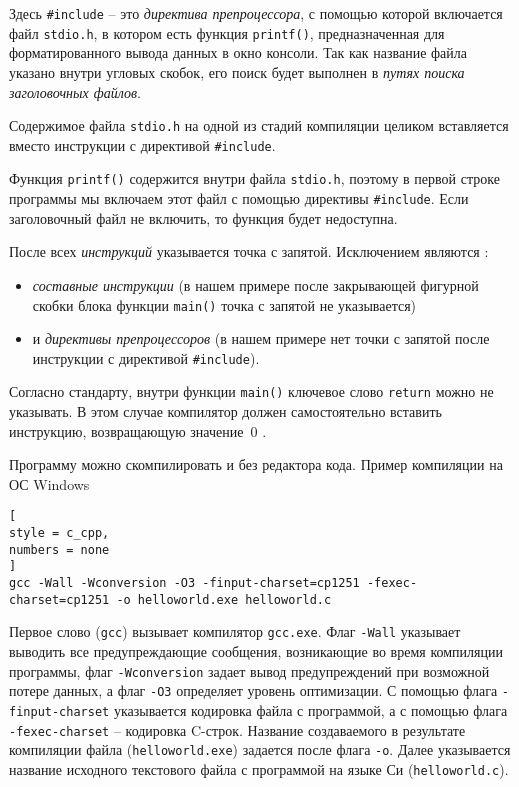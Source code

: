 \documentclass[%
	11pt,
	a4paper,
	utf8,
		]{article}
\begin{document}
Здесь \verb|#include| -- это \emph{директива препроцессора}, с помощью которой включается файл \verb|stdio.h|, в котором есть функция \verb|printf()|, предназначенная для форматированного вывода данных в окно консоли. Так как название файла указано внутри угловых скобок, его поиск будет выполнен в \emph{путях поиска заголовочных файлов}.

Содержимое файла \verb|stdio.h| на одной из стадий компиляции целиком вставляется вместо инструкции с директивой \verb|#include|.

Функция \verb|printf()| содержится внутри файла \verb|stdio.h|, поэтому в первой строке программы мы включаем этот файл с помощью директивы \verb|#include|. Если заголовочный файл не включить, то функция будет недоступна.

После всех \emph{инструкций} указывается точка с запятой. Исключением являются \cite[]{prokhorenok-prog-c:2020}:
\begin{itemize}
	\item \emph{составные инструкции} (в нашем примере после закрывающей фигурной скобки блока функции \verb|main()| точка с запятой не указывается)
	
	\item и \emph{директивы препроцессоров} (в нашем примере нет точки с запятой после инструкции с директивой \verb|#include|).
\end{itemize}

Согласно стандарту, внутри функции \verb|main()| ключевое слово \verb|return| можно не указывать. В этом случае компилятор должен самостоятельно вставить инструкцию, возвращающую значение~0 \cite[]{prokhorenok-prog-c:2020}.

Программу можно скомпилировать и без редактора кода. Пример компиляции на ОС Windows
\begin{lstlisting}[
style = c_cpp,
numbers = none
]
gcc -Wall -Wconversion -O3 -finput-charset=cp1251 -fexec-charset=cp1251 -o helloworld.exe helloworld.c
\end{lstlisting}

Первое слово (\verb|gcc|) вызывает компилятор \verb|gcc.exe|. Флаг \verb|-Wall| указывает выводить все предупреждающие сообщения, возникающие во время компиляции программы, флаг \verb|-Wconversion| задает вывод предупреждений при возможной потере данных, а флаг \verb|-O3| определяет уровень оптимизации. С помощью флага \verb|-finput-charset| указывается кодировка файла с программой, а с помощью флага \verb|-fexec-charset| -- кодировка C-строк. Название создаваемого в результате компиляции файла (\verb|helloworld.exe|) задается после флага \verb|-o|. Далее указывается название исходного текстового файла с программой на языке Си (\verb|helloworld.c|).
\end{document}
